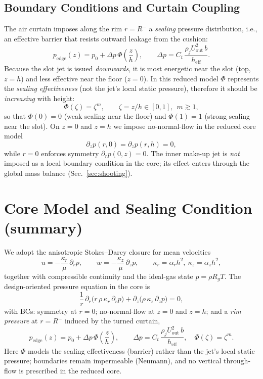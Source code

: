 \documentclass[11pt,a4paper]{article}
\begin{document}
\subsection{Boundary Conditions and Curtain Coupling}
The air curtain imposes along the rim $r=R^{-}$ a \emph{sealing} pressure distribution,
i.e., an effective barrier that resists outward leakage from the cushion:
\begin{equation}
  p_{\mathrm{edge}}(z)=p_0+\Delta p\,\Phi\!\left(\frac{z}{h}\right),
  \qquad
  \Delta p=C_t\,\frac{\rho_j U_{\mathrm{out}}^2\,b}{h_{\mathrm{eff}}}.
\end{equation}
Because the slot jet is issued \emph{downwards}, it is most energetic near the slot (top,
$z=h$) and less effective near the floor ($z=0$). In this reduced model $\Phi$ represents
the \emph{sealing effectiveness} (not the jet's local static pressure), therefore it
should be \emph{increasing} with height:
\begin{equation}
  \Phi(\zeta)= \zeta^{m}, \qquad \zeta=z/h\in[0,1],\ \ m\gtrsim 1,
\end{equation}
so that $\Phi(0)=0$ (weak sealing near the floor) and $\Phi(1)=1$ (strong sealing near
the slot).
On $z=0$ and $z=h$ we impose no-normal-flow in the reduced core model
\begin{equation}
  \partial_z p(r,0)=\partial_z p(r,h)=0,
\end{equation}
while $r=0$ enforces symmetry $\partial_r p(0,z)=0$. The inner make-up jet is
\emph{not} imposed as a local boundary condition in the core; its effect enters through
the global mass balance (Sec.~\ref{sec:shooting}).


\section{Core Model and Sealing Condition (summary)}
We adopt the anisotropic Stokes--Darcy closure for mean velocities
\begin{equation}
  u = -\frac{\kappa_r}{\mu}\,\partial_r p,\qquad
  w = -\frac{\kappa_z}{\mu}\,\partial_z p,\qquad
  \kappa_r=\alpha_r h^2,\ \kappa_z=\alpha_z h^2,
\end{equation}
together with compressible continuity and the ideal-gas state $p=\rho R_g T$.
The design-oriented pressure equation in the core is
\begin{equation}
  \frac{1}{r}\,\partial_r\!\big(r\,\rho\,\kappa_r\,\partial_r p\big)
  +\partial_z\!\big(\rho\,\kappa_z\,\partial_z p\big)=0,
\end{equation}
with BCs: symmetry at $r=0$; no-normal-flow at $z=0$ and $z=h$; and a \emph{rim pressure}
at $r=R^{-}$ induced by the turned curtain,
\begin{equation}
  p_{\mathrm{edge}}(z)=p_0 + \Delta p\,\Phi\!\left(\frac{z}{h}\right),\qquad
  \Delta p = C_t\,\frac{\rho_j U_{\mathrm{out}}^2\,b}{h_{\mathrm{eff}}},\quad
  \Phi(\zeta)=\zeta^m.
\end{equation}
Here $\Phi$ models the sealing effectiveness (barrier) rather than the jet's local static
pressure; boundaries remain impermeable (Neumann), and no vertical through-flow is
prescribed in the reduced core.
\end{document}
